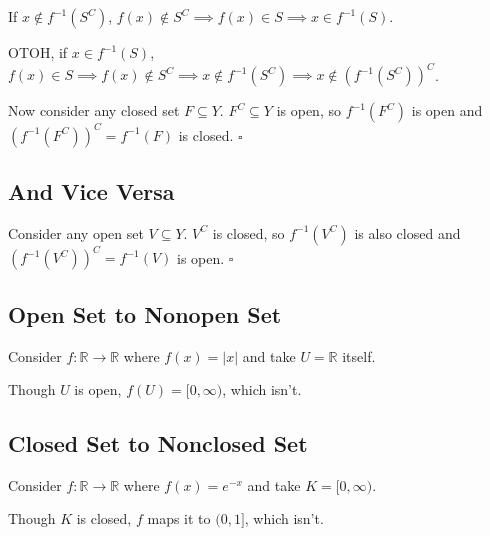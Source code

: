 \documentclass[12pt]{article}
\newcommand{\R}{\mathbb{R}}
\begin{document}
If $x \notin f^{-1}(S^C)$, $f(x) \notin S^C \implies f(x) \in S \implies x \in f^{-1}(S)$.

OTOH, if $x \in f^{-1}(S)$, $f(x) \in S \implies f(x) \notin S^C \implies x \notin f^{-1}(S^C) \implies x \notin \left(f^{-1}(S^C)\right)^C$.

Now consider any closed set $F \subseteq Y$.
$F^C \subseteq Y$ is open, so $f^{-1}(F^C)$ is open
and $\left(f^{-1}(F^C)\right)^C = f^{-1}(F)$ is closed. $\square$

\subsection{And Vice Versa}

Consider any open set $V \subseteq Y$.
$V^C$ is closed, so $f^{-1}\left(V^C\right)$ is also closed
and $\left(f^{-1}\left(V^C\right)\right)^C = f^{-1}(V)$ is open. $\square$

\subsection{Open Set to Nonopen Set}

Consider $f: \R \to \R$ where $f(x) = |x|$ and take $U = \R$ itself.

Though $U$ is open, $f(U) = [0, \infty)$, which isn't.

\subsection{Closed Set to Nonclosed Set}

Consider $f: \R \to \R$ where $f(x)=e^{-x}$ and take $K = [0, \infty)$.

Though $K$ is closed, $f$ maps it to $(0, 1]$, which isn't.
\end{document}
